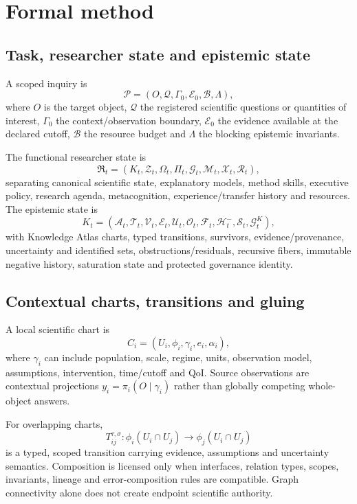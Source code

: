 \documentclass[11pt]{article}
\begin{document}
\section{Formal method}
\subsection{Task, researcher state and epistemic state}
A scoped inquiry is
\begin{equation}\mathcal P=(O,\mathcal Q,\Gamma_0,\mathcal E_0,\mathcal B,\Lambda),\end{equation}
where $O$ is the target object, $\mathcal Q$ the registered scientific questions or quantities of interest, $\Gamma_0$ the context/observation boundary, $\mathcal E_0$ the evidence available at the declared cutoff, $\mathcal B$ the resource budget and $\Lambda$ the blocking epistemic invariants.

The functional researcher state is
\begin{equation}\mathfrak R_t=(K_t,\mathcal Z_t,\Omega_t,\Pi_t,\mathcal G_t,\mathcal M_t,\mathcal X_t,\mathcal R_t),\end{equation}
separating canonical scientific state, explanatory models, method skills, executive policy, research agenda, metacognition, experience/transfer history and resources. The epistemic state is
\begin{equation}K_t=(\mathcal A_t,\mathcal T_t,\mathcal V_t,\mathcal E_t,\mathcal U_t,\mathcal O_t,\mathcal F_t,\mathcal H_t^{-},\mathcal S_t,\mathcal G_t^K),\end{equation}
with Knowledge Atlas charts, typed transitions, survivors, evidence/provenance, uncertainty and identified sets, obstructions/residuals, recursive fibers, immutable negative history, saturation state and protected governance identity.

\subsection{Contextual charts, transitions and gluing}
A local scientific chart is
\begin{equation}C_i=(U_i,\phi_i,\gamma_i,e_i,\alpha_i),\end{equation}
where $\gamma_i$ can include population, scale, regime, units, observation model, assumptions, intervention, time/cutoff and QoI. Source observations are contextual projections $y_i=\pi_i(O\mid\gamma_i)$ rather than globally competing whole-object answers.

For overlapping charts,
\begin{equation}T_{ij}^{\tau,\sigma}:\phi_i(U_i\cap U_j)\rightarrow\phi_j(U_i\cap U_j)\end{equation}
is a typed, scoped transition carrying evidence, assumptions and uncertainty semantics. Composition is licensed only when interfaces, relation types, scopes, invariants, lineage and error-composition rules are compatible. Graph connectivity alone does not create endpoint scientific authority.
\end{document}
